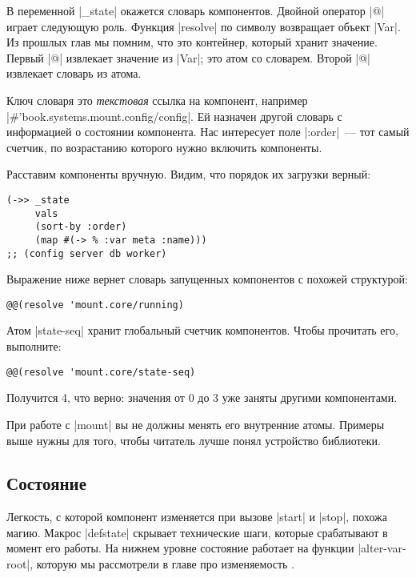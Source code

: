В переменной \spverb|_state| окажется словарь компонентов. Двойной оператор
\spverb|@| играет следующую роль. Функция \spverb|resolve| по символу возвращает
объект \spverb|Var|. Из прошлых глав мы помним, что это контейнер, который
хранит значение. Первый \spverb|@| извлекает значение из \spverb|Var|; это атом
со словарем. Второй \spverb|@| извлекает словарь из атома.

Ключ словаря это \emph{текстовая} ссылка на компонент, например
\spverb|#'book.systems.mount.config/config|. Ей назначен другой словарь с
информацией о состоянии компонента. Нас интересует поле \spverb|:order|~--- тот
самый счетчик, по возрастанию которого нужно включить компоненты.

Расставим компоненты вручную. Видим, что порядок их загрузки верный:

\begin{verbatim}
(->> _state
     vals
     (sort-by :order)
     (map #(-> % :var meta :name)))
;; (config server db worker)
\end{verbatim}

Выражение ниже вернет словарь запущенных компонентов с похожей структурой:

\begin{verbatim}
@@(resolve 'mount.core/running)
\end{verbatim}

Атом \spverb|state-seq| хранит глобальный счетчик компонентов. Чтобы прочитать
его, выполните:

\begin{verbatim}
@@(resolve 'mount.core/state-seq)
\end{verbatim}

Получится 4, что верно: значения от 0 до 3 уже заняты другими компонентами.

При работе с \spverb|mount| вы не должны менять его внутренние атомы. Примеры
выше нужны для того, чтобы читатель лучше понял устройство библиотеки.

\subsection{Состояние}

Легкость, с которой компонент изменяется при вызове \spverb|start| и
\spverb|stop|, похожа магию. Макрос \spverb|defstate| скрывает технические шаги,
которые срабатывают в момент его работы. На нижнем уровне состояние работает на
функции \spverb|alter-var-root|, которую мы рассмотрели в главе про
изменяемость .


